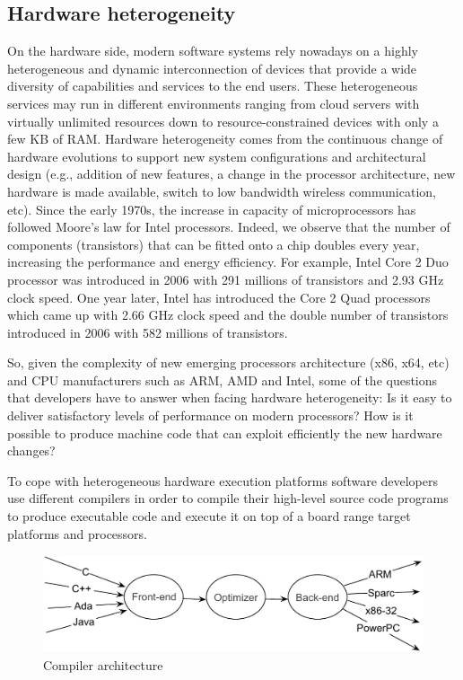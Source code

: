 \subsection{Hardware heterogeneity}
On the hardware side, modern software systems rely nowadays on a highly heterogeneous and dynamic interconnection of devices that provide a wide diversity of capabilities and services to the end users.
These heterogeneous services may run in different environments ranging from cloud servers with virtually unlimited resources down to resource-constrained devices with only a few KB of RAM.
Hardware heterogeneity comes from the continuous change of hardware evolutions to support new system configurations and architectural design (e.g., addition of new features, a change in the processor architecture, new hardware is made available, switch to low bandwidth wireless communication, etc). 
Since the early 1970s, the increase in capacity of microprocessors has followed Moore's law for Intel processors. Indeed, we observe that the number of components (transistors) that can be fitted onto a chip doubles every year, increasing the performance and energy efficiency.
For example, Intel Core 2 Duo processor was introduced in 2006 with 291 millions of transistors and 2.93 GHz clock speed. One year later, Intel has introduced the Core 2 Quad processors which came up with 2.66 GHz clock speed and the double number of transistors introduced in 2006 with 582 millions of transistors.

So, given the complexity of new emerging processors architecture (x86, x64, etc) and CPU manufacturers such as ARM, AMD and Intel, some of the questions that developers have to answer when facing hardware heterogeneity: 
Is it easy to deliver satisfactory levels of performance on modern processors? How is it possible to produce machine code that can exploit efficiently the new hardware changes? 

To cope with heterogeneous hardware execution platforms software developers use different compilers in order to compile their high-level source code programs to produce executable code and execute it on top of a board range target platforms and processors. 

\begin{figure}[h]
	\center
	\includegraphics[scale=0.65]{Background/fig/compilers}
	\caption{Compiler architecture}
\end{figure}

